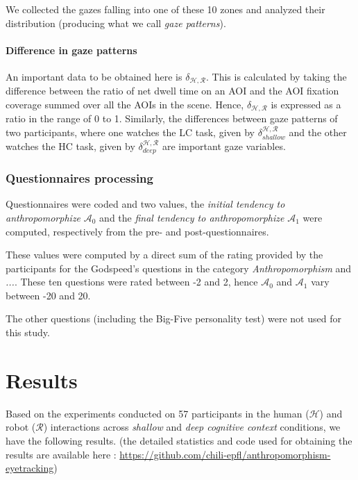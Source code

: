 \documentclass[lettersize, apacite, twoside, HRI]{apa_HRI}
\newcommand{\anti}{{$\mathcal{A}_0$ }}
\newcommand{\antf}{{$\mathcal{A}_1$ }}
\begin{document}
We collected the gazes falling into one of these 10 zones and analyzed
their distribution (producing what we call \emph{gaze patterns}).

\paragraph{Difference in gaze patterns}

An important data to be obtained here is $\delta_{\mathcal{H},\mathcal{R}}$. This is calculated by
taking the difference between the ratio of net dwell time on an AOI and the AOI
fixation coverage summed over all the AOIs in the scene. Hence,
$\delta_{\mathcal{H},\mathcal{R}}$ is expressed as a ratio in the range of 0 to
1. Similarly, the differences between gaze patterns of two participants, where
one watches the LC task, given by $\delta_{shallow}^{\mathcal{H},\mathcal{R}}$ and
the other watches the HC task, given by
$\delta_{deep}^{\mathcal{H},\mathcal{R}}$ are important gaze variables.

\subsubsection{Questionnaires processing}


Questionnaires were coded and two values, the \emph{initial tendency to
anthropomorphize} \anti and the \emph{final tendency to anthropomorphize} \antf
were computed, respectively from the pre- and post-questionnaires.

These values were computed by a direct sum of the rating provided by the
participants for the Godspeed's questions in the category
\emph{Anthropomorphism} and \emph{...}. These ten questions were
rated between -2 and 2, hence \anti and \antf vary between -20 and 20.

The other questions (including the Big-Five personality test) were not used for
this study.

\section{Results}

Based on the experiments conducted on 57 participants in the human
($\mathcal{H}$) and robot ($\mathcal{R}$) interactions across \emph{shallow} and
\emph{deep cognitive context} conditions, we have the following results. (the
detailed statistics and code used for obtaining the results are available here :
\url{https://github.com/chili-epfl/anthropomorphism-eyetracking})
\end{document}
